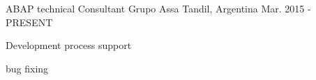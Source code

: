 


\begin{cventries}


\cventry
{ABAP technical Consultant} %
{Grupo Assa} %
{Tandil, Argentina} %
{Mar. 2015 - PRESENT} %
{ %
\begin{cvitems}
\item {Development process support}
\item {bug fixing}
\end{cvitems}
}



\end{cventries}
